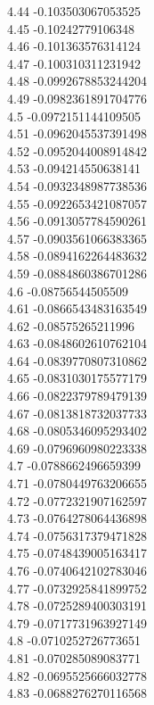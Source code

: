 {4.44	-0.103503067053525\\
4.45	-0.10242779106348\\
4.46	-0.101363576314124\\
4.47	-0.100310311231942\\
4.48	-0.0992678853244204\\
4.49	-0.0982361891704776\\
4.5	-0.0972151144109505\\
4.51	-0.0962045537391498\\
4.52	-0.0952044008914842\\
4.53	-0.094214550638141\\
4.54	-0.0932348987738536\\
4.55	-0.0922653421087057\\
4.56	-0.0913057784590261\\
4.57	-0.0903561066383365\\
4.58	-0.0894162264483632\\
4.59	-0.0884860386701286\\
4.6	-0.08756544505509\\
4.61	-0.0866543483163549\\
4.62	-0.08575265211996\\
4.63	-0.0848602610762104\\
4.64	-0.0839770807310862\\
4.65	-0.0831030175577179\\
4.66	-0.0822379789479139\\
4.67	-0.0813818732037733\\
4.68	-0.0805346095293402\\
4.69	-0.0796960980223338\\
4.7	-0.0788662496659399\\
4.71	-0.0780449763206655\\
4.72	-0.0772321907162597\\
4.73	-0.0764278064436898\\
4.74	-0.0756317379471828\\
4.75	-0.0748439005163417\\
4.76	-0.0740642102783046\\
4.77	-0.0732925841899752\\
4.78	-0.0725289400303191\\
4.79	-0.0717731963927149\\
4.8	-0.0710252726773651\\
4.81	-0.070285089083771\\
4.82	-0.0695525666032778\\
4.83	-0.0688276270116568\\
}
